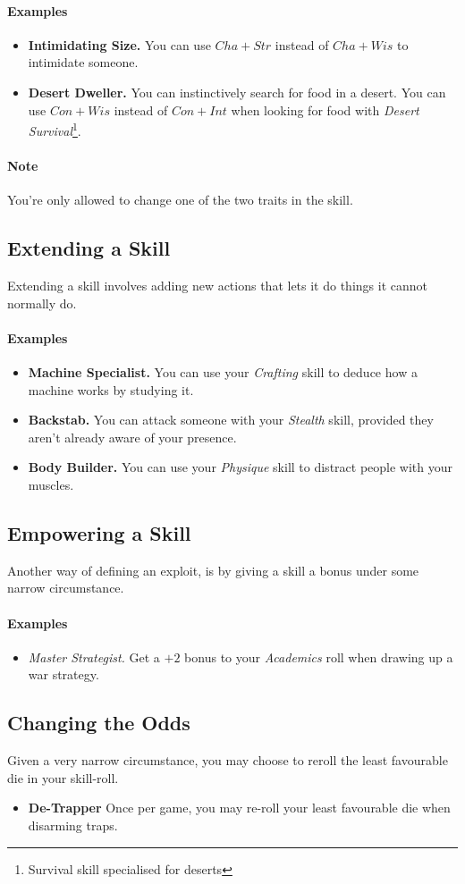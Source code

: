 \paragraph{Examples}
\begin{itemize}
    \item \textbf{Intimidating Size.} You can use $Cha+Str$ instead of $Cha+Wis$ to intimidate someone.
    \item \textbf{Desert Dweller.} You can instinctively search for food in a desert. You can use $Con+Wis$ instead of $Con+Int$ when looking for food with \textit{Desert Survival}\footnote{Survival skill specialised for deserts}.
\end{itemize}

\paragraph{Note} You're only allowed to change one of the two traits in the skill.

\subsection{Extending a Skill}
Extending a skill involves adding new actions that lets it do things it cannot normally do.

\paragraph{Examples}
\begin{itemize}
    \item \textbf{Machine Specialist.} You can use your \textit{Crafting} skill to deduce how a machine works by studying it.
    \item \textbf{Backstab.} You can attack someone with your \textit{Stealth} skill, provided they aren't already aware of your presence.
    \item \textbf{Body Builder.} You can use your \textit{Physique} skill to distract people with your muscles.
\end{itemize}

\subsection{Empowering a Skill}
Another way of defining an exploit, is by giving a skill a bonus under some narrow circumstance.

\paragraph{Examples}
\begin{itemize}
    \item \textit{Master Strategist.} Get a $+2$ bonus to your \textit{Academics} roll when drawing up a war strategy.
\end{itemize}

\subsection{Changing the Odds}
Given a very narrow circumstance, you may choose to reroll the least favourable die in your skill-roll.
\begin{itemize}
\item \textbf{De-Trapper} Once per game, you may re-roll your least favourable die when disarming traps.
\end{itemize}
